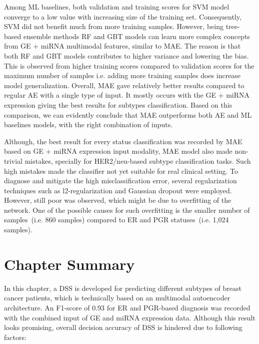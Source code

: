 \hspace*{3.5mm} Among ML baselines, both validation and training scores for SVM model converge to a low value with increasing size of the training set. Consequently, SVM did not benefit much from more training samples. However, being tree-based ensemble methods RF and GBT models can learn more complex concepts from GE + miRNA multimodal features, similar to MAE. The reason is that both RF and GBT models contributes to higher variance and lowering the bias. This is observed from higher training scores compared to validation scores for the maximum number of samples i.e. adding more training samples does increase model generalization. Overall, MAE gave relatively better results compared to regular AE with a single type of input. 
It mostly occurs with the GE + miRNA expression giving the best results for subtypes classification.
Based on this comparison, we can evidently conclude that MAE outperforms both AE and ML baselines models, with the right combination of inputs.

\hspace*{3.5mm} Although, the best result for every status classification was recorded by MAE based on  GE + miRNA expression input modality, MAE model also made non-trivial mistakes, specially for  HER2/neu-based subtype classification tasks. Such high mistakes made the classifier not yet suitable for real clinical setting. To diagnose and mitigate the high misclassification error, several regularization techniques such as l2-regularization and Gaussian dropout were employed. However, still poor was observed, which might be due to overfitting of the network. One of the possible causes for such overfitting is the smaller number of samples~(i.e. 860 samples) compared to ER and PGR statuses~(i.e. 1,024 samples). 

\section{Chapter Summary}\label{chapter_4:conclusion}
In this chapter, a DSS is developed for predicting different subtypes of breast cancer patients, which is technically based on an multimodal autoencoder architecture. An F1-score of 0.93 for ER and PGR-based diagnosis was recorded with the combined input of GE and miRNA expression data. Although this result looks promising, overall decision accuracy of DSS is hindered due to following factors: 

